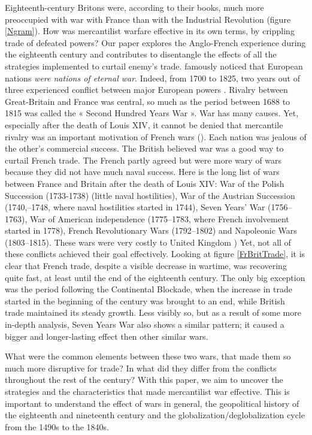 \documentclass[12pt,a4paper,notitlepage,english]{article}
\begin{document}
Eighteenth-century Britons were, according to their books, much more preoccupied with war with France than with the Industrial Revolution (figure \ref{Ngram}).
How was mercantilist warfare \citep{Conti2017} effective in its own terms, by crippling trade of defeated powers? Our paper explores the Anglo-French experience during the eighteenth century and contributes to disentangle the effects of all the  
strategies implemented to curtail enemy's trade.
\cite{Jefferson1823} famously noticed that European nations \textit{were nations of eternal war}. Indeed, from 1700 to 1825, two years out of three experienced conflict between major European powers \citep{Roser2016}. Rivalry between Great-Britain and France was central, so much as the period between 1688 to 1815 was called the « Second Hundred Years War ». War has many causes. Yet, especially after the death of Louis XIV, it cannot be denied that mercantile rivalry was an important motivation of French wars (\cite{Wallerstein1980, Brewer2002, Crouzet2008}). Each nation was jealous of the other's commercial success. The British believed war was a good way to curtail French trade. The French partly agreed but were more wary of wars because they did not have much naval success.
Here is the long list of wars between France and Britain after the death of Louis XIV: War of the Polish Succession (1733-1738) (little naval hostilities), War of the Austrian Succession (1740,–1748, where naval hostilities started in 1744), Seven Years' War (1756–1763), War of American independence (1775–1783, where French involvement started in 1778), French Revolutionary Wars (1792–1802) and Napoleonic Wars (1803–1815).
These wars were very costly to United Kingdom \cite{Baugh1965,Neal1977,Brewer2002})
Yet, not all of these conflicts achieved their goal effectively.
Looking at figure \ref{FrBritTrade}, it is clear that French trade, despite a visible decrease in wartime, was recovering quite fast, at least until the end of the eighteenth century.
The only big exception was the period following the Continental Blockade, when the increase in trade started in the beginning of the century was brought to an end, while British trade maintained its steady growth.
Less visibly so, but as a result of some more in-depth analysis, Seven Years War also shows a similar pattern; it caused a bigger and longer-lasting effect then other similar wars.

What were the common elements between these two wars, that made them so much more disruptive for trade? In what did they differ from the conflicts throughout the rest of the century? With this paper, we aim to uncover the strategies and the characteristics that made mercantilist war effective.
This is important to understand the effect of wars in general, the geopolitical history of the eighteenth and nineteenth century and the globalization/deglobalization cycle from the 1490s to the 1840s.
\end{document}
